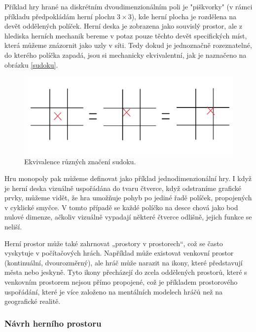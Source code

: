 Příklad hry hrané na diskrétním dvoudimenzionálním poli je "piškvorky" (v rámci příkladu předpokládám herní plochu $3\times3$), kde herní plocha je rozdělena na devět oddělených políček. Herní deska je zobrazena jako souvislý prostor, ale z hlediska herních mechanik bereme v potaz pouze těchto devět specifických míst, která můžeme znázornit jako uzly v síti. Tedy dokud je jednoznačně rozeznatelné, do kterého políčka zapadá, jsou si mechanicky ekvivalentní, jak je naznačeno na obrázku \vref{sudoku}.

\begin{figure}
  \centering      %
  \includegraphics[scale=0.3]{obr/sudoku.png} %
  \caption{Ekvivalence různých značení sudoku.} %
  \label{sudoku} %
\end{figure}

Hru monopoly pak můžeme definovat jako příklad jednodimenzionální hry. I když je herní deska vizuálně uspořádána do tvaru čtverce, když odstraníme grafické prvky, můžeme vidět, že hra umožňuje pohyb po jediné řadě políček, propojených v cyklické smyčce. V tomto případě se každé políčko na desce chová jako bod nulové dimenze, ačkoliv vizuálně vypadají některé čtverce odlišně, jejich funkce se neliší.

Herní prostor může také zahrnovat „prostory v prostorech“, což se často vyskytuje v počítačových hrách. Například může existovat venkovní prostor (kontinuální, dvourozměrný), ale hráč může narazit na ikony, které představují města nebo jeskyně. Tyto ikony přecházejí do zcela oddělených prostorů, které s venkovním prostorem nejsou přímo propojené, což je příkladem prostorového uspořádání, které je více založeno na mentálních modelech hráčů než na geografické realitě.

\subsubsection{Návrh herního prostoru}

